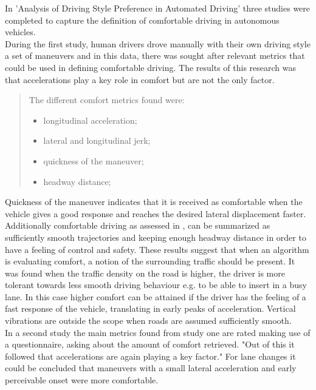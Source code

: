 In 'Analysis of Driving Style Preference in Automated Driving' \cite{Bellem} three studies were completed to capture the definition of comfortable driving in autonomous vehicles.\\
During the first study, human drivers drove manually with their own driving style a set of maneuvers and in this data, there was sought after relevant metrics that could be used in defining comfortable driving. The results of this research was that accelerations play a key role in comfort but are not the only factor. \cite{Bellem}

\begin{quote}
	The different comfort metrics found were:
	\begin{itemize}
		\item longitudinal acceleration;
		\item lateral and longitudinal jerk;
		\item quickness of the maneuver;
		\item headway distance;
	\end{itemize}
\end{quote}

Quickness of the maneuver indicates that it is received as comfortable when the vehicle gives a good response and reaches the desired lateral displacement faster.
Additionally comfortable driving as assessed in \cite{Bellem}, can be summarized as  sufficiently smooth trajectories and keeping enough headway distance in order to have a feeling of control and safety. These results suggest that when an algorithm is evaluating comfort, a notion of the surrounding traffic should be present. It was found when the traffic density on the road is higher, the driver is more tolerant towards less smooth driving behaviour e.g. to be able to insert in a busy lane. In this case higher comfort can be attained if the driver has the feeling of a fast response of the vehicle, translating in early peaks of acceleration. Vertical vibrations are outside the scope when roads are assumed sufficiently smooth.\\

In a second study the main metrics found from study one are rated making use of a questionnaire, asking about the amount of comfort retrieved. "Out of this it followed that accelerations are again playing a key factor." \cite{Bellem} For lane changes it could be concluded that maneuvers with a small lateral acceleration and early perceivable onset were more comfortable.\\

